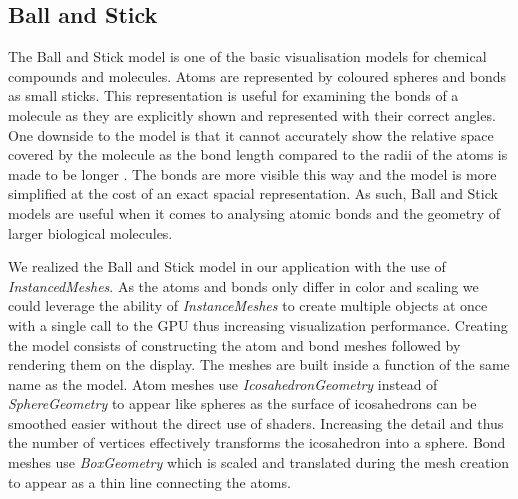 \subsection{Ball and Stick}
\label{sec:implementation:molmodels:ballstick}

The Ball and Stick model is one of the basic visualisation models for chemical compounds and molecules. Atoms are represented by coloured spheres and bonds as small sticks. This representation is useful for examining the bonds of a molecule as they are explicitly shown and represented with their correct angles. One downside to the model is that it cannot accurately show the relative space covered by the molecule as the bond length compared to the radii of the atoms is made to be longer \cite{Hamzah2022Jul}. The bonds are more visible this way and the model is more simplified at the cost of an exact spacial representation. As such, Ball and Stick models are useful when it comes to analysing atomic bonds and the geometry of larger biological molecules.

We realized the Ball and Stick model in our application with the use of \textit{InstancedMeshes}. As the atoms and bonds only differ in color and scaling we could leverage the ability of \textit{InstanceMeshes} to create multiple objects at once with a single call to the GPU thus increasing visualization performance. Creating the model consists of constructing the atom and bond meshes followed by rendering them on the display. The meshes are built inside a function of the same name as the model. Atom meshes use \textit{IcosahedronGeometry} instead of \textit{SphereGeometry} to appear like spheres as the surface of icosahedrons can be smoothed easier without the direct use of shaders. Increasing the detail and thus the number of vertices effectively transforms the icosahedron into a sphere. Bond meshes use \textit{BoxGeometry} which is scaled and translated during the mesh creation to appear as a thin line connecting the atoms.

